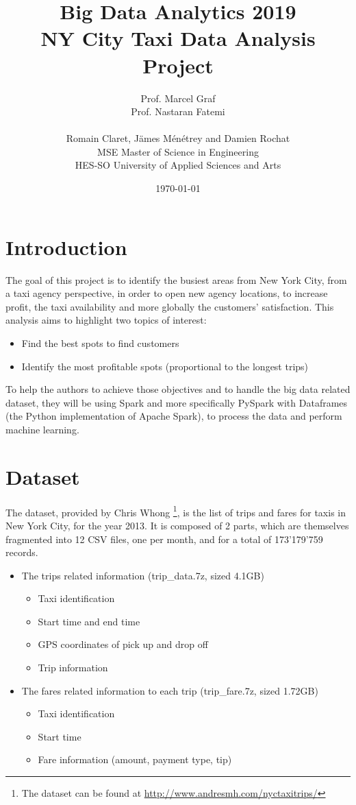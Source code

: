 \documentclass[a4paper]{article}
\title{
\Large{Big Data Analytics 2019}\\
\huge{NY City Taxi Data Analysis}\\
\large{Project}}
\author{
Prof. Marcel Graf\\
Prof. Nastaran Fatemi\\
\\
Romain Claret, Jämes Ménétrey and Damien Rochat\\
MSE Master of Science in Engineering\\
HES-SO University of Applied Sciences and Arts
\date{\today}}
\begin{document}
\maketitle

\tableofcontents
\clearpage

\section{Introduction}
The goal of this project is to identify the busiest areas from New York City, from a taxi agency perspective, in order to open new agency locations, to increase profit, the taxi availability and more globally the customers' satisfaction. This analysis aims to highlight two topics of interest:

\begin{itemize}
    \item Find the best spots to find customers
    \item Identify the most profitable spots (proportional to the longest trips)
\end{itemize}

To help the authors to achieve those objectives and to handle the big data related dataset, they will be using Spark and more specifically PySpark with Dataframes (the Python implementation of Apache Spark), to process the data and perform machine learning.


\section{Dataset}
The dataset, provided by Chris Whong \footnote{The dataset can be found at \url{http://www.andresmh.com/nyctaxitrips/}}, is the list of trips and fares for taxis in New York City, for the year 2013. It is composed of 2 parts, which are themselves fragmented into 12 CSV files, one per month, and for a total of 173'179'759 records.

\begin{itemize}
    \item The trips related information (trip\_data.7z, sized 4.1GB)
    \begin{itemize}
        \item Taxi identification
        \item Start time and end time
        \item GPS coordinates of pick up and drop off
        \item Trip information
    \end{itemize}
    \item The fares related information to each trip (trip\_fare.7z, sized 1.72GB)
    \begin{itemize}
        \item Taxi identification
        \item Start time
        \item Fare information (amount, payment type, tip)
    \end{itemize}
\end{itemize}
\end{document}
